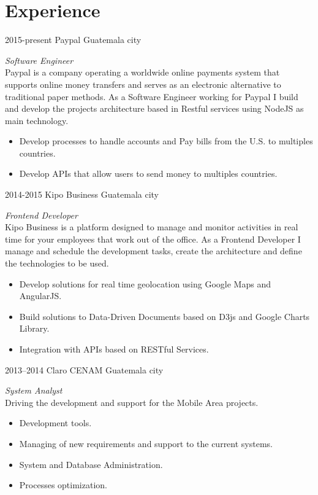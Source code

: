 \documentclass[]{friggeri-cv} %
\begin{document}
\section{Experience}
\begin{entrylist}
\entry
	{2015-present}
	{Paypal}
	{Guatemala city}
	{\emph{Software Engineer} \\
	Paypal is a company operating a worldwide online payments system that supports online money transfers
	and serves as an electronic alternative to traditional paper methods. As a Software Engineer working for
	Paypal I build and develop the projects architecture based in Restful services using NodeJS as main technology.
	\begin{itemize}
		\item Develop processes to handle accounts and Pay bills from the U.S. to multiples countries.
		\item Develop APIs that allow users to send money to multiples countries.
	\end{itemize}
	}

\entry
	{2014-2015}
	{Kipo Business}
	{Guatemala city}
	{\emph{Frontend Developer} \\
	Kipo Business is a platform designed to manage and monitor activities in real time for your employees that
	work out of the office. As a Frontend Developer I manage and schedule the development tasks, create the architecture and define the technologies
	to be used.
	\begin{itemize}
		\item Develop solutions for real time geolocation using Google Maps and AngularJS.
		\item Build solutions to Data-Driven Documents based on D3js and Google Charts Library.
		\item Integration with APIs based on RESTful Services.
	\end{itemize}
	}
	
\entry
	{2013--2014}
	{Claro CENAM}
	{Guatemala city}
	{\emph{System Analyst} \\
	Driving the development and support for the Mobile Area projects.
	\begin{itemize}
		\item Development tools.
		\item Managing of new requirements and support to the current systems.
		\item System and Database Administration.
		\item Processes optimization.
		
	\end{itemize}
	}

\end{entrylist}
\end{document}
